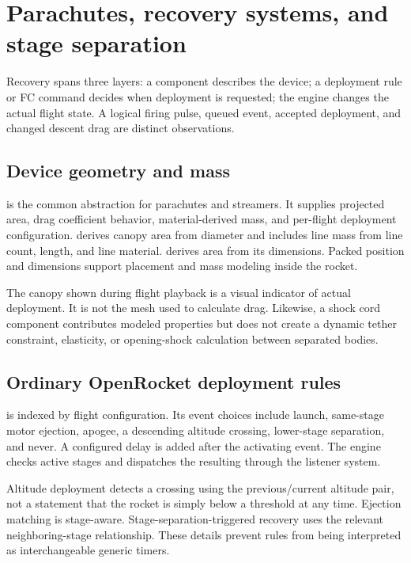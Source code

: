 \chapter{Parachutes, recovery systems, and stage separation}\label{ch:recovery}
Recovery spans three layers: a component describes the device; a deployment rule or FC command decides when deployment is requested; the engine changes the actual flight state. A logical firing pulse, queued event, accepted deployment, and changed descent drag are distinct observations.

\section{Device geometry and mass}
 is the common abstraction for parachutes and streamers. It supplies projected area, drag coefficient behavior, material-derived mass, and per-flight deployment configuration.  derives canopy area from diameter and includes line mass from line count, length, and line material.  derives area from its dimensions. Packed position and dimensions support placement and mass modeling inside the rocket.

The canopy shown during flight playback is a visual indicator of actual deployment. It is not the mesh used to calculate drag. Likewise, a shock cord component contributes modeled properties but does not create a dynamic tether constraint, elasticity, or opening-shock calculation between separated bodies.

\section{Ordinary OpenRocket deployment rules}
 is indexed by flight configuration. Its event choices include launch, same-stage motor ejection, apogee, a descending altitude crossing, lower-stage separation, and never. A configured delay is added after the activating event. The engine checks active stages and dispatches the resulting  through the listener system.

Altitude deployment detects a crossing using the previous/current altitude pair, not a statement that the rocket is simply below a threshold at any time. Ejection matching is stage-aware. Stage-separation-triggered recovery uses the relevant neighboring-stage relationship. These details prevent rules from being interpreted as interchangeable generic timers.

